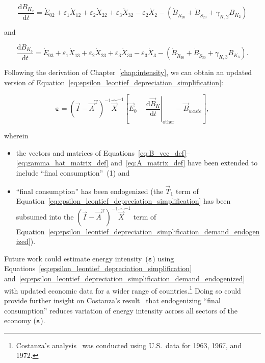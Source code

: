 \begin{equation} \label{eq:C-Total_Energy_Sec_2-unfinished}
	\frac{\mathrm{d}B_{K_{2}}}{\mathrm{d}t}
	= \dot{E}_{02}
	+ \varepsilon_{1} \dot{X}_{12}
	+ \varepsilon_{2} \dot{X}_{22}
	+ \varepsilon_{3} \dot{X}_{32}
	- \varepsilon_{2} \dot{X}_{2}
	- \left( \dot{B}_{\dot{R}_{20}} 
							+ \dot{B}_{\dot{S}_{20}}
							+ \gamma_{K,2} B_{K_{2}}
							\right)
\end{equation}

\noindent{}and

\begin{equation} \label{eq:C-Total_Energy_Sec_3-unfinished}
	\frac{\mathrm{d}B_{K_{3}}}{\mathrm{d}t}
	= \dot{E}_{03}
	+ \varepsilon_{1} \dot{X}_{13}
	+ \varepsilon_{2} \dot{X}_{23}
	+ \varepsilon_{3} \dot{X}_{33}
	- \varepsilon_{3} \dot{X}_{3}
	- \left( \dot{B}_{\dot{R}_{30}} 
							+ \dot{B}_{\dot{S}_{30}}
							+ \gamma_{K,3} B_{K_{3}}
							\right).
\end{equation}

\noindent{}Following the derivation of Chapter~\ref{chap:intensity},
we can obtain an updated version 
of Equation~\ref{eq:epsilon_leontief_depreciation_simplification}:

\begin{equation} \label{eq:epsilon_leontief_depreciation_simplification_demand_endogenized}
	\bm{\varepsilon} 
	= {(\vec{I} - \vec{A}^{\mathrm{T}})}^{-1}\hat{\vec{X}}^{-1}
		\left[\vec{E}_{0} 
				- \left. \frac{\mathrm{d}\vec{B}_{K}}{\mathrm{d}t} \right|_{\mathrm{other}}
				- \vec{B}_{waste}
		\right],
\end{equation}

\noindent{}wherein 

\begin{itemize}
	\item{the vectors and matrices of Equations~\ref{eq:B_vec_def}--\ref{eq:gamma_hat_matrix_def}
	and~\ref{eq:A_matrix_def} have been extended to include ``final consumption''~(1) and}
	\item{ ``final consumption'' has been endogenized
	(the $\vec{T}_{1}$ term of Equation~\ref{eq:epsilon_leontief_depreciation_simplification}
	has been subsumed into the 
	${(\vec{I} - \vec{A}^{\mathrm{T}})}^{-1}\hat{\vec{X}}^{-1}$
	term of Equation~\ref{eq:epsilon_leontief_depreciation_simplification_demand_endogenized}).}
\end{itemize}

Future work could estimate energy intensity~($\bm{\varepsilon}$) 
using Equations~\ref{eq:epsilon_leontief_depreciation_simplification}
and~\ref{eq:epsilon_leontief_depreciation_simplification_demand_endogenized}
with updated economic data for a wider range of countries.\footnote{Costanza's
analysis~\cite{Costanza:1980ww} was conducted using U.S.\ data for 1963, 1967, and 1972.}
Doing so could provide further insight on Costanza's result~\cite{Costanza:1980ww}
that endogenizing ``final consumption'' reduces variation 
of energy intensity across all sectors of the economy ($\bm{\varepsilon}$).


